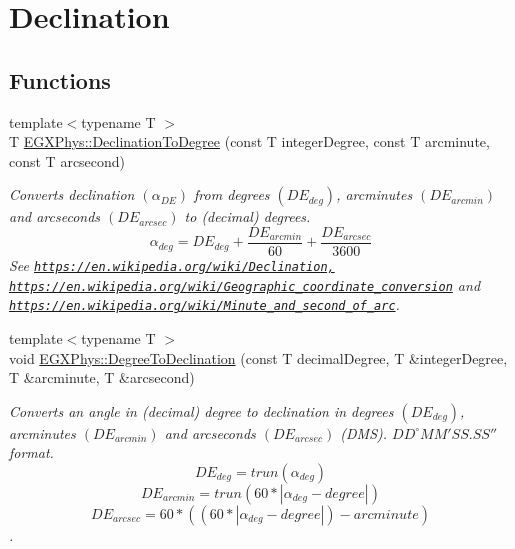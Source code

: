 \hypertarget{group___e_g_x_phys-_astrophysics-_declination}{}\section{Declination}
\label{group___e_g_x_phys-_astrophysics-_declination}
\subsection*{Functions}
\begin{DoxyCompactItemize}
\item 
{\footnotesize template$<$typename T $>$ }\\T \mbox{\hyperlink{group___e_g_x_phys-_astrophysics-_declination_ga0c90ea1406801810378d9618553c9a9b}{E\+G\+X\+Phys\+::\+Declination\+To\+Degree}} (const T integer\+Degree, const T arcminute, const T arcsecond)
\begin{DoxyCompactList}\small\item\em Converts declination $(\alpha_{DE})$ from degrees $(DE_{deg})$, arcminutes $(DE_{arcmin})$ and arcseconds $(DE_{arcsec})$ to (decimal) degrees. \[\alpha_{deg}=DE_{deg} + \frac{DE_{arcmin}}{60} + \frac{DE_{arcsec}}{3600} \] See \href{https://en.wikipedia.org/wiki/Declination,}{\tt https\+://en.\+wikipedia.\+org/wiki/\+Declination,} \href{https://en.wikipedia.org/wiki/Geographic_coordinate_conversion}{\tt https\+://en.\+wikipedia.\+org/wiki/\+Geographic\+\_\+coordinate\+\_\+conversion} and \href{https://en.wikipedia.org/wiki/Minute_and_second_of_arc}{\tt https\+://en.\+wikipedia.\+org/wiki/\+Minute\+\_\+and\+\_\+second\+\_\+of\+\_\+arc}. \end{DoxyCompactList}\item 
{\footnotesize template$<$typename T $>$ }\\void \mbox{\hyperlink{group___e_g_x_phys-_astrophysics-_declination_gaff645fbd9a1de42e9cdbfb37fdac78c9}{E\+G\+X\+Phys\+::\+Degree\+To\+Declination}} (const T decimal\+Degree, T \&integer\+Degree, T \&arcminute, T \&arcsecond)
\begin{DoxyCompactList}\small\item\em Converts an angle in (decimal) degree to declination in degrees $(DE_{deg})$, arcminutes $(DE_{arcmin})$ and arcseconds $(DE_{arcsec})$ (D\+MS). ${DD}^{\circ}{MM}'{SS.SS}''$ format. \[DE_{deg}=trun(\alpha_{deg})\] \[DE_{arcmin}=trun(60 * |\alpha_{deg} - degree|)\] \[DE_{arcsec}=60 * ((60 * |\alpha_{deg} - degree|)-arcminute)\]. \end{DoxyCompactList}\item 

\end{DoxyCompactItemize}

